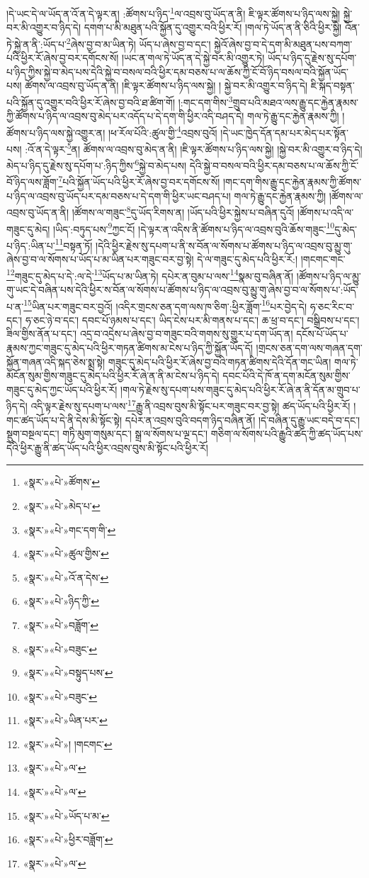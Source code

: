 །དེ་ཡང་དེ་ལ་ཡོད་ན་འོ་ན་དེ་ལྟར་ན། :ཚོགས་པ་ཉིད་\footnote{«སྣར་»«པེ་»ཚོགས་}ལ་འབྲས་བུ་ཡོད་ན་ནི། ཇི་ལྟར་ཚོགས་པ་ཉིད་ལས་སྐྱེ། སྐྱེ་བར་མི་འགྱུར་བ་ཉིད་དེ། དགག་པ་མི་མཐུན་པའི་སྐྱོན་དུ་འགྱུར་བའི་ཕྱིར་རོ། །གལ་ཏེ་ཡོད་ན་ནི་ཅིའི་ཕྱིར་སྐྱེ། འོན་ཏེ་སྐྱེ་ན་ནི་:ཡོད་པ་\footnote{«སྣར་»«པེ་»མེད་པ་}ཞེས་བྱ་བ་མ་ཡིན་ཏེ། ཡོད་པ་ཞེས་བྱ་བ་དང་། སྐྱེའོ་ཞེས་བྱ་བ་དེ་དག་མི་མཐུན་པས་བཀག་པའི་ཕྱིར་རོ་ཞེས་བྱ་བར་དགོངས་སོ། །ཡང་ན་གལ་ཏེ་ཡོད་ན་དེ་སྐྱེ་བར་མི་འགྱུར་ཏེ། ཡོད་པ་ཉིད་དུ་རྗེས་སུ་དཔོག་པ་ཉིད་ཀྱིས་སྐྱེ་བ་མེད་པས་དེའི་སྐྱེ་བ་བསལ་བའི་ཕྱིར་དམ་བཅས་པ་ལ་ཆོས་ཀྱི་ངོ་བོ་ཉིད་བསལ་བའི་སྐྱོན་ཡོད་པས། ཚོགས་ལ་འབྲས་བུ་ཡོད་ན་ནི། །ཇི་ལྟར་ཚོགས་པ་ཉིད་ལས་སྐྱེ། །
སྐྱེ་བར་མི་འགྱུར་བ་ཉིད་དེ། ཇི་སྐད་བསྟན་པའི་སྐྱོན་དུ་འགྱུར་བའི་ཕྱིར་རོ་ཞེས་བྱ་བའི་ཐ་ཚིག་གོ། །:གང་དག་གིས་\footnote{«སྣར་»«པེ་»གང་དག་གི་}གྲུབ་པའི་མཐའ་ལས་རྒྱུ་དང་རྐྱེན་རྣམས་ཀྱི་ཚོགས་པ་ཉིད་ལ་འབྲས་བུ་མེད་པར་འདོད་པ་དེ་དག་གི་ཕྱིར་འདི་བཤད་དེ། གལ་ཏེ་རྒྱུ་དང་རྐྱེན་རྣམས་ཀྱི། །ཚོགས་པ་ཉིད་ལས་སྐྱེ་འགྱུར་ན། །ཕ་རོལ་པོའི་:ཚུལ་གྱི་\footnote{«སྣར་»«པེ་»ཚུལ་གྱིས་}འབྲས་བུའོ། །དེ་ཡང་ཁྱེད་དོན་དམ་པར་མེད་པར་སྟོན་པས། :འོ་ན་དེ་ལྟར་\footnote{«སྣར་»«པེ་»འོ་ན་དེས་}ན། ཚོགས་ལ་འབྲས་བུ་མེད་ན་ནི། །ཇི་ལྟར་ཚོགས་པ་ཉིད་ལས་སྐྱེ། །སྐྱེ་བར་མི་འགྱུར་བ་ཉིད་དེ། མེད་པ་ཉིད་དུ་རྗེས་སུ་དཔོག་པ་:ཉིད་ཀྱིས་\footnote{«སྣར་»«པེ་»ཉིད་ཀྱི་}སྐྱེ་བ་མེད་པས། དེའི་སྐྱེ་བ་བསལ་བའི་ཕྱིར་དམ་བཅས་པ་ལ་ཆོས་ཀྱི་ངོ་བོ་ཉིད་ལས་ཟློག་\footnote{«སྣར་»«པེ་»བཟློག་}པའི་སྐྱོན་ཡོད་པའི་ཕྱིར་རོ་ཞེས་བྱ་བར་དགོངས་སོ། །གང་དག་གིས་རྒྱུ་དང་རྐྱེན་རྣམས་ཀྱི་ཚོགས་པ་ཉིད་ལ་འབྲས་བུ་ཡོད་པར་དམ་བཅས་པ་དེ་དག་གི་ཕྱིར་ཡང་བཤད་པ། གལ་ཏེ་རྒྱུ་དང་རྐྱེན་རྣམས་ཀྱི། །ཚོགས་ལ་འབྲས་བུ་ཡོད་ན་ནི། །ཚོགས་ལ་གཟུང་\footnote{«སྣར་»«པེ་»བཟུང་}དུ་ཡོད་རིགས་ན། །ཡོད་པའི་ཕྱིར་སྐྱེས་པ་བཞིན་དུའོ། །ཚོགས་པ་འདི་ལ་གཟུང་དུ་མེད། །ཡིད་:བཏུད་པས་\footnote{«སྣར་»«པེ་»བསྟུད་པས་}ཀྱང་ངོ། །དེ་ལྟར་ན་འདིས་ནི་ཚོགས་པ་ཉིད་ལ་འབྲས་བུའི་ཆོས་གཟུང་\footnote{«སྣར་»«པེ་»བཟུང་}དུ་མེད་པ་ཉིད་:ཡིན་པ་\footnote{«སྣར་»«པེ་»ཡིན་པར་}བསྟན་ཏོ། །དེའི་ཕྱིར་རྗེས་སུ་དཔག་པ་ནི་ས་བོན་ལ་སོགས་པ་ཚོགས་པ་ཉིད་ལ་འབྲས་བུ་མྱུ་གུ་ཞེས་བྱ་བ་ལ་སོགས་པ་ཡོད་པ་མ་ཡིན་པར་གཟུང་བར་བྱ་སྟེ། དེ་ལ་གཟུང་དུ་མེད་པའི་ཕྱིར་རོ:། །གངགང་གང་\footnote{«སྣར་»«པེ་»། །གངགང་}གཟུང་དུ་མེད་པ་དེ་:ལ་དེ་\footnote{«སྣར་»«པེ་»ལ་}ཡོད་པ་མ་ཡིན་ཏེ། དཔེར་ན་བུམ་པ་ལས་\footnote{«སྣར་»«པེ་»ལ་}སྣམ་བུ་བཞིན་ནོ། །ཚོགས་པ་ཉིད་ལ་མྱུ་གུ་ཡང་དེ་བཞིན་པས་དེའི་ཕྱིར་ས་བོན་ལ་སོགས་པ་ཚོགས་པ་ཉིད་ལ་འབྲས་བུ་མྱུ་གུ་ཞེས་བྱ་བ་ལ་སོགས་པ་:ཡོད་པ་ན་\footnote{«སྣར་»«པེ་»ཡོད་པ་མ་}ཡིན་པར་གཟུང་བར་བྱའོ། །འདིར་གྲངས་ཅན་དག་ལས་ཁ་ཅིག་:ཕྱིར་ཟློག་\footnote{«སྣར་»«པེ་»ཕྱིར་བཟློག་}པར་བྱེད་དེ། ཧ་ཅང་རིང་བ་དང་། ཧ་ཅང་ཉེ་བ་དང་། དབང་པོ་ཉམས་པ་དང་། ཡིད་ངེས་པར་མི་གནས་པ་དང་། ཆ་ཕྲ་བ་དང་། བསྒྲིབས་པ་དང་། ཟིལ་གྱིས་ནོན་པ་དང་། འདྲ་བ་འདྲེས་པ་ཞེས་བྱ་བ་གཟུང་བའི་གགས་སུ་གྱུར་པ་དག་ཡོད་ན། དངོས་པོ་ཡོད་པ་རྣམས་ཀྱང་གཟུང་དུ་མེད་པའི་ཕྱིར་གཏན་ཚིགས་མ་ངེས་པ་ཉིད་ཀྱི་སྐྱོན་ཡོད་དོ། །གྲངས་ཅན་དག་ལས་གཞན་དག་སྐྱོན་གཞན་འདི་སྐད་ཅེས་སྨྲ་སྟེ། གཟུང་དུ་མེད་པའི་ཕྱིར་རོ་ཞེས་བྱ་བའི་གཏན་ཚིགས་དེའི་དོན་གང་ཡིན། གལ་ཏེ་མངོན་སུམ་གྱིས་གཟུང་དུ་མེད་པའི་ཕྱིར་རོ་ཞེ་ན་ནི་མ་ངེས་པ་ཉིད་དེ། དབང་པོའི་དེ་ཁོ་ན་དག་མངོན་སུམ་གྱིས་གཟུང་དུ་མེད་ཀྱང་ཡོད་པའི་ཕྱིར་རོ། །གལ་ཏེ་རྗེས་སུ་དཔག་པས་གཟུང་དུ་མེད་པའི་ཕྱིར་རོ་ཞེ་ན་ནི་དོན་མ་གྲུབ་པ་ཉིད་དེ། འདི་ལྟར་རྗེས་སུ་དཔག་པ་ལས་\footnote{«སྣར་»«པེ་»ལ་}རྒྱུ་ནི་འབྲས་བུས་མི་སྟོང་པར་གཟུང་བར་བྱ་སྟེ། ཚད་ཡོད་པའི་ཕྱིར་རོ། །གང་ཚད་ཡོད་པ་དེ་ནི་དེས་མི་སྟོང་སྟེ། དཔེར་ན་འབྲས་བུའི་བདག་ཉིད་བཞིན་ནོ། །དེ་བཞིན་དུ་རྒྱུ་ཡང་བདེ་བ་དང་། སྡུག་བསྔལ་དང་། གཏི་མུག་གསུམ་དང་། སྒྲ་ལ་སོགས་པ་ལྔ་དང་། གཅིག་ལ་སོགས་པའི་རྒྱུའི་ཚད་ཀྱི་ཚད་ཡོད་པས་དེའི་ཕྱིར་རྒྱུ་ནི་ཚད་ཡོད་པའི་ཕྱིར་འབྲས་བུས་མི་སྟོང་པའི་ཕྱིར་རོ། 